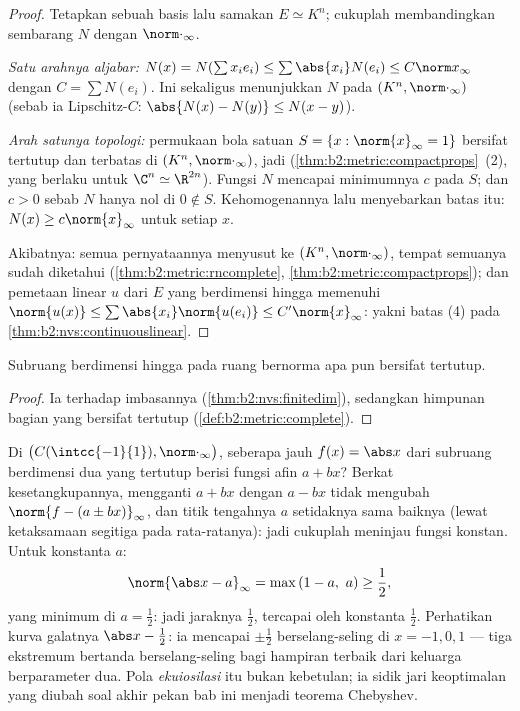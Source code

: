 \begin{proof}
Tetapkan sebuah basis lalu samakan $E \simeq K^n$; cukuplah
membandingkan sembarang  $N$ dengan $\norm\cdot_\infty$.

\emph{Satu arahnya aljabar:} $N(x) = N(\sum x_i e_i) \leq
\sum \abs{x_i} N(e_i) \leq C \norm x_\infty$ dengan $C = \sum N(e_i)$.
Ini sekaligus menunjukkan $N$  pada $(K^n, \norm\cdot_\infty)$
(sebab ia Lipschitz-$C$: $\abs{N(x) - N(y)} \leq N(x - y)$).

\emph{Arah satunya topologi:} permukaan bola satuan $S = \{x :
\norm{x}_\infty = 1\}$ bersifat tertutup dan terbatas di $(K^n,
\norm\cdot_\infty)$, jadi 
(\cref{thm:b2:metric:compactprops}~(2), yang berlaku untuk $\C^n \simeq
\R^{2n}$). Fungsi  $N$ mencapai minimumnya $c$ pada
$S$; dan $c > 0$ sebab $N$ hanya nol di $0 \notin S$. Kehomogenannya
lalu menyebarkan batas itu: $N(x) \geq c \norm{x}_\infty$ untuk setiap $x$.

Akibatnya: semua pernyataannya menyusut ke $(K^n,
\norm\cdot_\infty)$, tempat semuanya sudah diketahui
(\cref{thm:b2:metric:rncomplete},
\cref{thm:b2:metric:compactprops}); dan pemetaan linear $u$ dari
$E$ yang berdimensi hingga memenuhi $\norm{u(x)} \leq \sum\abs{x_i}
\norm{u(e_i)} \leq C'\norm{x}_\infty$: yakni batas (4) pada
\cref{thm:b2:nvs:continuouslinear}.
\end{proof}

\begin{corollary}\label{cor:b2:nvs:closedsubspace}
Subruang berdimensi hingga pada ruang bernorma apa pun bersifat tertutup.
\end{corollary}

\begin{proof}
Ia  terhadap  imbasannya
(\cref{thm:b2:nvs:finitedim}), sedangkan himpunan bagian yang 
bersifat tertutup (\cref{def:b2:metric:complete}).
\end{proof}

\begin{example}\label{ex:b2:nvs:bestaffine}
Di $\bigl(C(\intcc{-1}{1}), \norm\cdot_\infty\bigr)$, seberapa jauh
$f(x) = \abs x$ dari subruang berdimensi dua yang tertutup berisi
fungsi afin $a + bx$? Berkat kesetangkupannya, mengganti $a + bx$ dengan
$a - bx$ tidak mengubah $\norm{f - (a \pm bx)}_\infty$, dan
titik tengahnya $a$ setidaknya sama baiknya (lewat ketaksamaan segitiga
pada rata-ratanya): jadi cukuplah meninjau fungsi konstan. Untuk
konstanta $a$:
\[
\norm{\abs x - a}_\infty = \max\,(1 - a,\ a)
\geq \frac12 ,
\]
yang minimum di $a = \frac12$: jadi jaraknya $\frac12$, tercapai
oleh konstanta $\frac12$. Perhatikan kurva galatnya $\abs x -
\frac12$: ia mencapai $\pm\frac12$ berselang-seling di $x = -1, 0,
1$ --- tiga ekstremum bertanda berselang-seling bagi hampiran
terbaik dari keluarga berparameter dua. Pola
\emph{ekuiosilasi} itu bukan kebetulan; ia sidik jari keoptimalan yang
diubah soal akhir pekan bab ini menjadi teorema Chebyshev.
\end{example}


